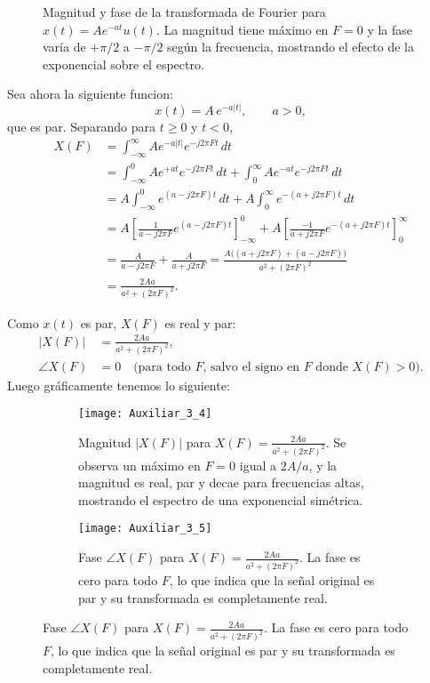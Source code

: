 \documentclass[
  11pt,
  letterpaper,
   addpoints,
   answers
  ]{exam}
\begin{document}
\begin{questions}
\begin{solution}
\begin{figure}[H]
  \caption{Magnitud y fase de la transformada de Fourier para $x(t)=A e^{-a t}u(t)$. La magnitud tiene máximo en $F=0$ y la fase varía de $+\pi/2$ a $-\pi/2$ según la frecuencia, mostrando el efecto de la exponencial sobre el espectro.}
  \label{fig:mag_fase_XF}
\end{figure}


Sea ahora la siguiente funcion:
\[
x(t)=A\,e^{-a|t|},\qquad a>0,
\]
que es par. Separando para \(t\ge 0\) y \(t<0\),
\begin{align}
X(F)
 &= \int_{-\infty}^{\infty} A e^{-a|t|} e^{-j2\pi F t}\,dt \\
 &= \int_{-\infty}^{0} A e^{+a t} e^{-j2\pi F t}\,dt
   + \int_{0}^{\infty} A e^{-a t} e^{-j2\pi F t}\,dt \\
 &= A\int_{-\infty}^{0} e^{(a-j2\pi F)t}\,dt
   +A\int_{0}^{\infty} e^{-(a+j2\pi F)t}\,dt \\
 &= A\left[\frac{1}{a-j2\pi F}e^{(a-j2\pi F)t}\right]_{-\infty}^{0}
   +A\left[\frac{-1}{a+j2\pi F}e^{-(a+j2\pi F)t}\right]_{0}^{\infty} \\
 &= \frac{A}{a-j2\pi F}+\frac{A}{a+j2\pi F}
  = \frac{A\big((a+j2\pi F)+(a-j2\pi F)\big)}{a^{2}+(2\pi F)^{2}} \\
 &= \frac{2A a}{a^{2}+(2\pi F)^{2}}.
\end{align}

Como \(x(t)\) es par, \(X(F)\) es real y par:
\begin{align}
|X(F)|
  &= \frac{2A a}{a^{2}+(2\pi F)^{2}},\\
\angle X(F)
  &= 0\quad \text{(para todo \(F\), salvo el signo en \(F\) donde \(X(F)>0\))}.
\end{align}
Luego gráficamente tenemos lo siguiente:
\begin{figure}[H]
  \centering

  \begin{subfigure}[t]{0.48\textwidth}
    \centering
    \texttt{[image: Auxiliar\_3\_4]} %
    \caption{Magnitud $|X(F)|$ para $X(F)=\frac{2Aa}{a^2+(2\pi F)^2}$. Se observa un máximo en $F=0$ igual a $2A/a$, y la magnitud es real, par y decae para frecuencias altas, mostrando el espectro de una exponencial simétrica.}
    \label{fig:mag_XF}
  \end{subfigure}
  \hfill
  \begin{subfigure}[t]{0.48\textwidth}
    \centering
    \texttt{[image: Auxiliar\_3\_5]}
    \caption{Fase $\angle X(F)$ para $X(F)=\frac{2Aa}{a^2+(2\pi F)^2}$. La fase es cero para todo $F$, lo que indica que la señal original es par y su transformada es completamente real.}
    \label{fig:fase_XF2}
  \end{subfigure}


\end{figure}
\end{solution}
\end{questions}
\end{document}
